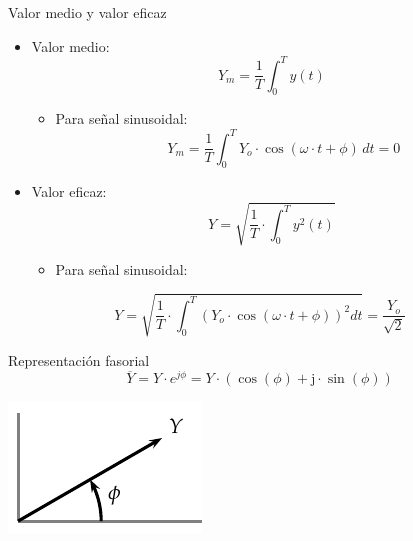 \documentclass[xcolor={usenames,svgnames,dvipsnames}]{beamer}
\begin{document}
\begin{frame}[label={sec:orgccd74bf}]{Valor medio y valor eficaz}
\begin{itemize}
\item \alert{Valor medio}: $$Y_m=\frac{1}{T}\int_{0}^{T}y(t)$$

\begin{itemize}
\item Para señal sinusoidal:
$$Y_m=\frac{1}{T}\int_{0}^{T}Y_{o}\cdot\cos(\omega\cdot
            t+\phi)\, dt=0$$
\end{itemize}

\item \alert{Valor eficaz}:
$$Y = \sqrt{\frac{1}{T}\cdot\int_{0}^{T}y^{2}(t)}$$

\begin{itemize}
\item Para señal sinusoidal:
\end{itemize}
\end{itemize}

$$Y=\sqrt{\frac{1}{T}\cdot\int_{0}^{T}\left(Y_{o}\cdot\cos(\omega\cdot
      t+\phi)\right)^{2}dt}=\frac{Y_{o}}{\sqrt{2}}$$
\end{frame}

\begin{frame}[label={sec:orgd01500f}]{Representación fasorial}
$$\overline{Y}=Y\cdot e^{j\phi}=Y\cdot(\cos(\phi)+\mathrm{j}\cdot\sin(\phi))$$

\begin{center}
\includegraphics[width=.9\linewidth]{../figs/Fasor.pdf}
\end{center}
\end{frame}
\end{document}
